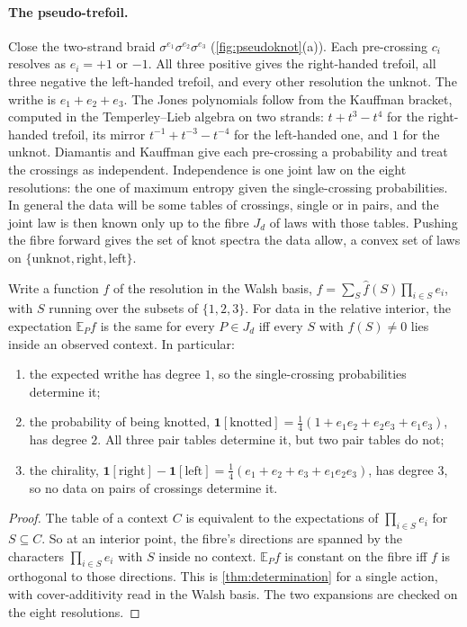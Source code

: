 \documentclass[11pt]{article}
\theoremstyle{definition}\newtheorem{definition}[theorem]{Definition}\newtheorem{remark}[theorem]{Remark}\newtheorem{example}[theorem]{Example}\newtheorem{problem}[theorem]{Open problem}\crefname{problem}{Problem}{Problems}
\begin{document}
\paragraph{The pseudo-trefoil.} Close the two-strand braid $\sigma^{e_1}\sigma^{e_2}\sigma^{e_3}$ (\cref{fig:pseudoknot}(a)). Each pre-crossing $c_i$ resolves as $e_i=+1$ or $-1$. All three positive gives the right-handed trefoil, all three negative the left-handed trefoil, and every other resolution the unknot. The writhe is $e_1+e_2+e_3$. The Jones polynomials follow from the Kauffman bracket, computed in the Temperley--Lieb algebra on two strands: $t+t^3-t^4$ for the right-handed trefoil, its mirror $t^{-1}+t^{-3}-t^{-4}$ for the left-handed one, and $1$ for the unknot. Diamantis and Kauffman give each pre-crossing a probability and treat the crossings as independent. Independence is one joint law on the eight resolutions: the one of maximum entropy given the single-crossing probabilities. In general the data will be some tables of crossings, single or in pairs, and the joint law is then known only up to the fibre $J_d$ of laws with those tables. Pushing the fibre forward gives the set of knot spectra the data allow, a convex set of laws on $\{\text{unknot},\text{right},\text{left}\}$.

\begin{proposition}\label{prop:pseudoknot}
Write a function $f$ of the resolution in the Walsh basis, $f=\sum_S\hat f(S)\prod_{i\in S}e_i$, with $S$ running over the subsets of $\{1,2,3\}$. For data in the relative interior, the expectation $\mathbb E_Pf$ is the same for every $P\in J_d$ iff every $S$ with $\hat f(S)\ne0$ lies inside an observed context. In particular:
\begin{enumerate}
\item[(1)] the expected writhe has degree $1$, so the single-crossing probabilities determine it;
\item[(2)] the probability of being knotted, $\mathbf 1[\text{knotted}]=\tfrac14(1+e_1e_2+e_2e_3+e_1e_3)$, has degree $2$. All three pair tables determine it, but two pair tables do not;
\item[(3)] the chirality, $\mathbf 1[\text{right}]-\mathbf 1[\text{left}]=\tfrac14(e_1+e_2+e_3+e_1e_2e_3)$, has degree $3$, so no data on pairs of crossings determine it.
\end{enumerate}
\end{proposition}

\begin{proof}
The table of a context $C$ is equivalent to the expectations of $\prod_{i\in S}e_i$ for $S\subseteq C$. So at an interior point, the fibre's directions are spanned by the characters $\prod_{i\in S}e_i$ with $S$ inside no context. $\mathbb E_Pf$ is constant on the fibre iff $f$ is orthogonal to those directions. This is \cref{thm:determination} for a single action, with cover-additivity read in the Walsh basis. The two expansions are checked on the eight resolutions.
\end{proof}
\end{document}

